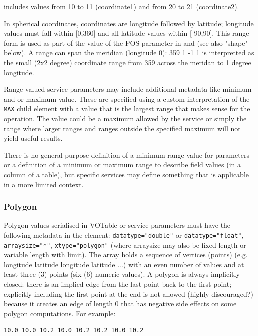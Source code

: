 \documentclass[11pt,letter]{ivoa}
\begin{document}
includes values from 10 to 11 (coordinate1) and from 20 to 21 (coordinate2).

In spherical coordinates, coordinates are longitude followed by latitude; longitude values must
fall within [0,360] and all latitude values within [-90,90]. This range form is used as part of
the value of the POS parameter in \citep{2015ivoa.spec.1223D} and \citep{2017ivoa.spec.0517B}
(see also "shape" below). A range can span the meridian (longitude 0): 359 1 -1 1 is interpretted
as the small (2x2 degree) coordinate range from 359 across the meridan to 1 degree longitude.

Range-valued service parameters may include additional metadata like minimum and
or maximum value. These are specified using a custom interpretation of the
\verb|MAX| child element with a value that is the largest range that makes sense
for the operation. The value could be a maximum allowed by the service or simply
the range where larger ranges and ranges outside the specified maximum will not yield
useful results.

There is no general purpose definition of a minimum range value for parameters or
a definition of a minimum or maximum range to describe field values (in a column
of a table), but specific services may define something that is applicable in a
more limited context.

\subsubsection{Polygon}
Polygon values serialised in VOTable or service parameters must have the following metadata in the 
 element: \verb|datatype="double"| or \verb|datatype="float"|,  \verb|arraysize="*"|, \verb|xtype="polygon"|
(where arraysize may also be fixed length or variable length with limit).
The array holds a sequence of vertices (points) (e.g. longitude latitude longitude 
latitude ...) with an even number of values and at least three (3) points (six 
(6) numeric values). A polygon is always implicitly closed: there is an implied edge from
the last point back to the first point; explicitly including the first point at the end is
not allowed (highly discouraged?) because it creates an edge of length 0 that has
negative side effects on some polygon computations. For example:

\begin{verbatim}
10.0 10.0 10.2 10.0 10.2 10.2 10.0 10.2
\end{verbatim}
\end{document}
